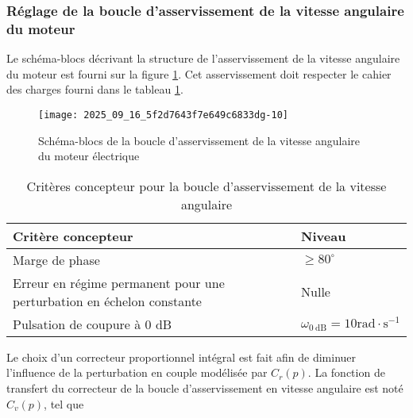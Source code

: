 %
\subsubsection{Réglage de la boucle d'asservissement de la vitesse angulaire du moteur}%


\ifprof
\else

Le schéma-blocs décrivant la structure de l'asservissement de la vitesse angulaire du moteur est fourni sur la figure \ref{ccs_mp_2023_fig_12}. Cet asservissement doit respecter le cahier des charges fourni dans le tableau \ref{ccs_mp_2023_tab_04}.



\begin{figure}[!h]
\centering
\texttt{[image: 2025\_09\_16\_5f2d7643f7e649c6833dg-10]}
\caption{\label{ccs_mp_2023_fig_12}  Schéma-blocs de la boucle d'asservissement de la vitesse angulaire du moteur électrique}
\end{figure}



\begin{table}[h]
\begin{center}
\begin{tabular}{ll}
\hline
\textbf{Critère concepteur} & \textbf{Niveau} \\
\hline
Marge de phase & $\geqslant 80^{\circ}$ \\

Erreur en régime permanent pour une perturbation en échelon constante & Nulle \\

Pulsation de coupure à 0 dB & $\omega_{0 \mathrm{~dB}}=10 \mathrm{rad} \cdot \mathrm{s}^{-1}$ \\
\hline
\end{tabular}
\caption{\label{ccs_mp_2023_tab_04}Critères concepteur pour la boucle d'asservissement de la vitesse angulaire}
\end{center}
\end{table}

Le choix d'un correcteur proportionnel intégral est fait afin de diminuer l'influence de la perturbation en couple modélisée par $C_{r}(p)$. La fonction de transfert du correcteur de la boucle d'asservissement en vitesse angulaire est noté $C_{v}(p)$, tel que

